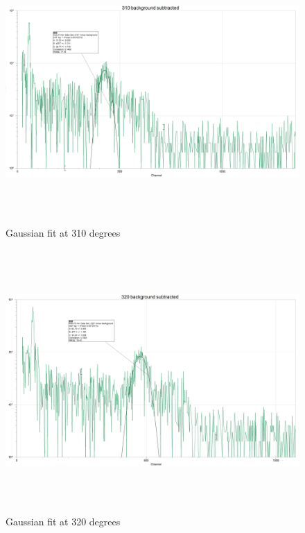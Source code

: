 \documentclass[fleqn]{article}
\begin{document}
  \begin{figure}[htbp]
    \includegraphics[height=10cm, width=18cm]{Eight.JPG}
    \caption{
      Gaussian fit at 310 degrees
    }
  \end{figure}

  \pagebreak

  \begin{figure}[htbp]
    \includegraphics[height=10cm, width=18cm]{Nine.JPG}
    \caption{
      Gaussian fit at 320 degrees
    }
  \end{figure}

  \pagebreak
\end{document}
